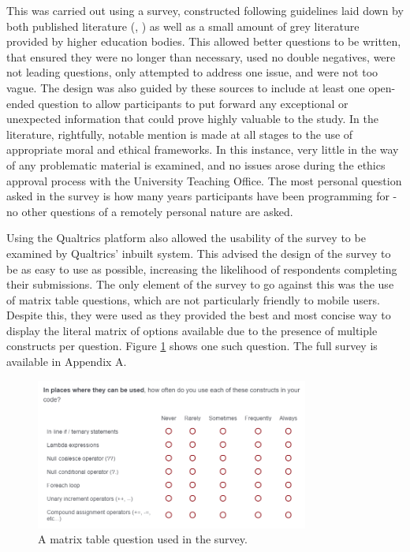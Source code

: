 \documentclass{article}
\begin{document}
        This was carried out using a survey, constructed following guidelines laid down by both published literature (\cite{goodSurveys1}, \cite{goodSurveys2}) as well as a small amount of grey literature provided by higher education bodies. This allowed better questions to be written, that ensured they were no longer than necessary, used no double negatives, were not leading questions, only attempted to address one issue, and were not too vague. The design was also guided by these sources to include at least one open-ended question to allow participants to put forward any exceptional or unexpected information that could prove highly valuable to the study. In the literature, rightfully, notable mention is made at all stages to the use of appropriate moral and ethical frameworks. In this instance, very little in the way of any problematic material is examined, and no issues arose during the ethics approval process with the University Teaching Office. The most personal question asked in the survey is how many years participants have been programming for - no other questions of a remotely personal nature are asked.

        Using the Qualtrics platform also allowed the usability of the survey to be examined by Qualtrics' inbuilt system. This advised the design of the survey to be as easy to use as possible, increasing the likelihood of respondents completing their submissions. The only element of the survey to go against this was the use of matrix table questions, which are not particularly friendly to mobile users. Despite this, they were used as they provided the best and most concise way to display the literal matrix of options available due to the presence of multiple constructs per question. Figure \ref{fig:matrixTable} shows one such question. The full survey is available in Appendix A.
        
        \begin{figure}[htbp]
            \centering
            \includegraphics[width=0.8\textwidth]{matrixTable}
            \caption{A matrix table question used in the survey.}
            \label{fig:matrixTable}
        \end{figure}
\end{document}
